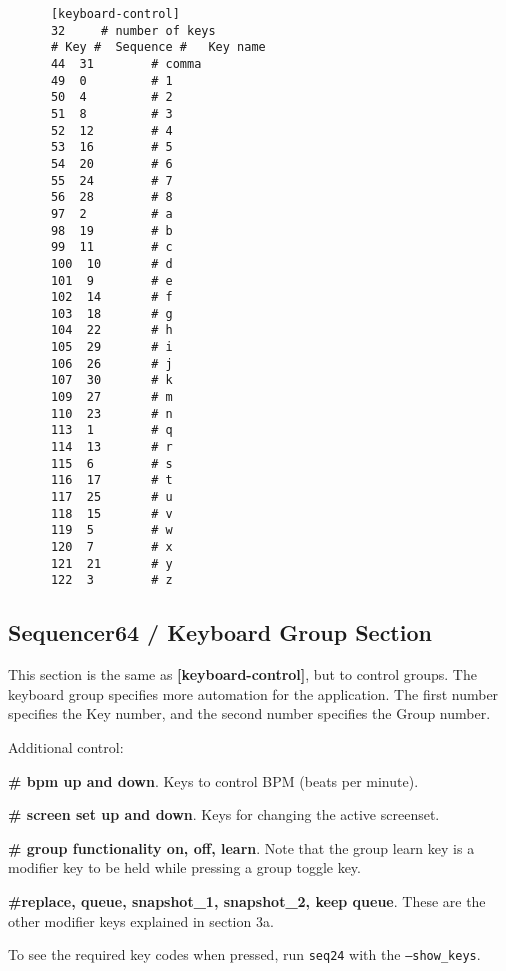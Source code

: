    \begin{verbatim}
      [keyboard-control]
      32     # number of keys
      # Key #  Sequence #   Key name
      44  31        # comma
      49  0         # 1
      50  4         # 2
      51  8         # 3
      52  12        # 4
      53  16        # 5
      54  20        # 6
      55  24        # 7
      56  28        # 8
      97  2         # a
      98  19        # b
      99  11        # c
      100  10       # d
      101  9        # e
      102  14       # f
      103  18       # g
      104  22       # h
      105  29       # i
      106  26       # j
      107  30       # k
      109  27       # m
      110  23       # n
      113  1        # q
      114  13       # r
      115  6        # s
      116  17       # t
      117  25       # u
      118  15       # v
      119  5        # w
      120  7        # x
      121  21       # y
      122  3        # z
   \end{verbatim}

\subsection{Sequencer64 / Keyboard Group Section}
\label{subsec:seq64_rc_file_keyboard_group}

   This section is the same as
   \textbf{[keyboard-control]}, but to control groups.
   The keyboard group specifies more automation for the application.  The
   first number specifies the Key number, and the second number specifies
   the Group number.

   Additional control:

   \begin{enumber}
   	\item \textbf{\# bpm up and down}.
	      Keys to control BPM (beats per minute).
      \item \textbf{\# screen set up and down}.
	      Keys for changing the active screenset.
      \item \textbf{\# group functionality on, off, learn}.
	      Note that the group learn key is a modifier key to be held while 
         pressing a group toggle key.
      \item \textbf{\#replace, queue, snapshot\_1, snapshot\_2, keep queue}.
         These are the other modifier keys explained in section 3a.
   \end{enumber}

	To see the required key codes when pressed, run \texttt{seq24} with
   the \texttt{--show\_keys}.

